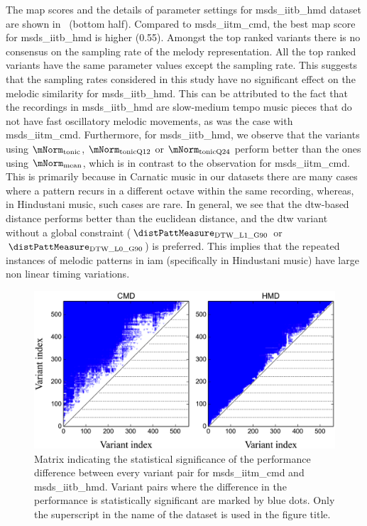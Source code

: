 The \gls{map} scores and the details of parameter settings for \acrshort{msds_iitb_hmd} dataset are shown in~ (bottom half). Compared to \acrshort{msds_iitm_cmd}, the best \gls{map} score for \acrshort{msds_iitb_hmd} is higher (0.55). Amongst the top ranked variants there is no consensus on the sampling rate of the melody representation. All the top ranked variants have the same parameter values except the sampling rate. This suggests that the sampling rates considered in this study have no significant effect on the melodic similarity for \acrshort{msds_iitb_hmd}. This can be attributed to the fact that the recordings in \acrshort{msds_iitb_hmd} are slow-medium tempo music pieces that do not have fast oscillatory melodic movements, as was the case with \acrshort{msds_iitm_cmd}. Furthermore, for \acrshort{msds_iitb_hmd}, we observe that the variants using $\mNorm_{\mathrm{tonic}}$, $\mNorm_{\mathrm{tonicQ12}}$ or $\mNorm_{\mathrm{tonicQ24}}$ perform better than the ones using $\mNorm_{\mathrm{mean}}$, which is in contrast to the observation for \acrshort{msds_iitm_cmd}. This is primarily because in Carnatic music in our datasets there are many cases where a pattern recurs in a different octave within the same recording, whereas, in Hindustani music, such cases are rare. In general, we see that the \gls{dtw}-based distance performs better than the euclidean distance, and the \gls{dtw} variant without a global constraint ($\distPattMeasure_{\mathrm{DTW\_L1\_G90}}$ or $\distPattMeasure_{\mathrm{DTW\_L0\_G90}}$) is preferred. This implies that the repeated instances of melodic patterns in \gls{iam} (specifically in Hindustani music) have large non linear timing variations.

\begin{figure}[h]
	\begin{center}
		\includegraphics[width=\figSizeNinety]{ch06_patterns/figures/SimilarityEvaluation/StatisticalDiff.png}
	\end{center}
	\caption[Matrix indicating the statistical significance of the performance difference between different method variants]{Matrix indicating the statistical significance of the performance difference between every variant pair for \acrshort{msds_iitm_cmd} and \acrshort{msds_iitb_hmd}. Variant pairs where the difference in the performance is statistically significant are marked by blue dots. Only the superscript in the name of the dataset is used in the figure title.}
	\label{fig:patterns_statistical_significance_similarity_evaluation}
\end{figure}

